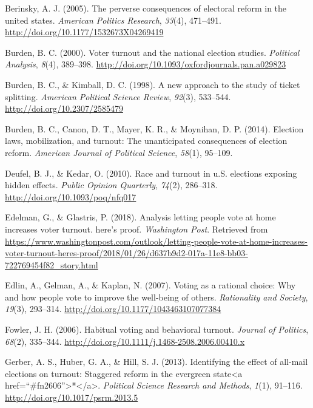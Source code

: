 \documentclass[12pt,twoside]{reedthesis}
\begin{document}
  \hypertarget{ref-berinsky_perverse_2005}{}
  Berinsky, A. J. (2005). The perverse consequences of electoral reform in
  the united states. \emph{American Politics Research}, \emph{33}(4),
  471--491. \url{http://doi.org/10.1177/1532673X04269419}
  
  \hypertarget{ref-burden_voter_2000}{}
  Burden, B. C. (2000). Voter turnout and the national election studies.
  \emph{Political Analysis}, \emph{8}(4), 389--398.
  \url{http://doi.org/10.1093/oxfordjournals.pan.a029823}
  
  \hypertarget{ref-burden_new_1998}{}
  Burden, B. C., \& Kimball, D. C. (1998). A new approach to the study of
  ticket splitting. \emph{American Political Science Review},
  \emph{92}(3), 533--544. \url{http://doi.org/10.2307/2585479}
  
  \hypertarget{ref-burden_election_2014}{}
  Burden, B. C., Canon, D. T., Mayer, K. R., \& Moynihan, D. P. (2014).
  Election laws, mobilization, and turnout: The unanticipated consequences
  of election reform. \emph{American Journal of Political Science},
  \emph{58}(1), 95--109.
  
  \hypertarget{ref-deufel_race_2010}{}
  Deufel, B. J., \& Kedar, O. (2010). Race and turnout in u.S. elections
  exposing hidden effects. \emph{Public Opinion Quarterly}, \emph{74}(2),
  286--318. \url{http://doi.org/10.1093/poq/nfq017}
  
  \hypertarget{ref-edelman_analysis_2018}{}
  Edelman, G., \& Glastris, P. (2018). Analysis letting people vote at
  home increases voter turnout. here's proof. \emph{Washington Post}.
  Retrieved from
  \url{https://www.washingtonpost.com/outlook/letting-people-vote-at-home-increases-voter-turnout-heres-proof/2018/01/26/d637b9d2-017a-11e8-bb03-722769454f82_story.html}
  
  \hypertarget{ref-edlin_voting_2007}{}
  Edlin, A., Gelman, A., \& Kaplan, N. (2007). Voting as a rational
  choice: Why and how people vote to improve the well-being of others.
  \emph{Rationality and Society}, \emph{19}(3), 293--314.
  \url{http://doi.org/10.1177/1043463107077384}
  
  \hypertarget{ref-fowler_habitual_2006}{}
  Fowler, J. H. (2006). Habitual voting and behavioral turnout.
  \emph{Journal of Politics}, \emph{68}(2), 335--344.
  \url{http://doi.org/10.1111/j.1468-2508.2006.00410.x}
  
  \hypertarget{ref-gerber_identifying_2013}{}
  Gerber, A. S., Huber, G. A., \& Hill, S. J. (2013). Identifying the
  effect of all-mail elections on turnout: Staggered reform in the
  evergreen state\textless{}a
  href=``\#fn2606''\textgreater{}*\textless{}/a\textgreater{}.
  \emph{Political Science Research and Methods}, \emph{1}(1), 91--116.
  \url{http://doi.org/10.1017/psrm.2013.5}
  
\end{document}
